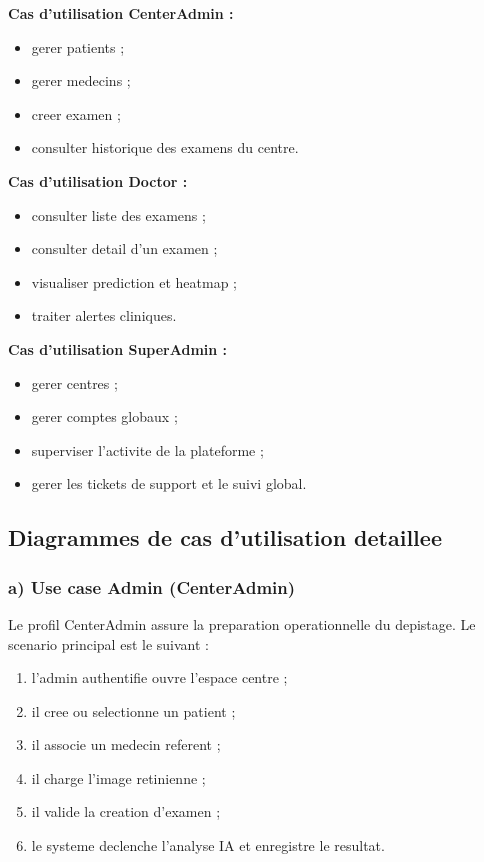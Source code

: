 \textbf{Cas d'utilisation CenterAdmin :}
\begin{itemize}
    \item gerer patients ;
    \item gerer medecins ;
    \item creer examen ;
    \item consulter historique des examens du centre.
\end{itemize}

\textbf{Cas d'utilisation Doctor :}
\begin{itemize}
    \item consulter liste des examens ;
    \item consulter detail d'un examen ;
    \item visualiser prediction et heatmap ;
    \item traiter alertes cliniques.
\end{itemize}

\textbf{Cas d'utilisation SuperAdmin :}
\begin{itemize}
    \item gerer centres ;
    \item gerer comptes globaux ;
    \item superviser l'activite de la plateforme ;
    \item gerer les tickets de support et le suivi global.
\end{itemize}

\subsection{Diagrammes de cas d'utilisation detaillee}

\subsubsection*{a) Use case Admin (CenterAdmin)}
Le profil CenterAdmin assure la preparation operationnelle du depistage.
Le scenario principal est le suivant :
\begin{enumerate}
    \item l'admin authentifie ouvre l'espace centre ;
    \item il cree ou selectionne un patient ;
    \item il associe un medecin referent ;
    \item il charge l'image retinienne ;
    \item il valide la creation d'examen ;
    \item le systeme declenche l'analyse IA et enregistre le resultat.
\end{enumerate}

